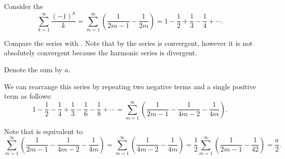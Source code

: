 \begin{example}\label{ex:riemanns_series_permutation_theorem/alternating_harmonic_series}\cite[]{Фихтенгольц1968Том2}
  Consider the 
  \begin{equation}\label{ex:riemanns_series_permutation_theorem/alternating_harmonic_series/series}
    \sum_{k=1}^\infty \frac {(-1)^k} k
    =
    \sum_{m=1}^\infty \left( \frac 1 {2m - 1} - \frac 1 {2m} \right)
    =
    1 - \frac 1 2 + \frac 1 3 - \frac 1 4 + \cdots.
  \end{equation}

  Compare the series with . Note that by  the series is convergent, however it is not absolutely convergent because the harmonic series  is divergent.

  Denote the sum by \( a \).

  We can rearrange this series by repeating two negative terms and a single positive term as follows:
  \begin{equation}\label{ex:riemanns_series_permutation_theorem/alternating_harmonic_series/rearranged}
    1 - \frac 1 2 - \frac 1 4 + \frac 1 3 - \frac 1 6 - \frac 1 8 + \cdots
    =
    \sum_{m=1}^\infty \left( \frac 1 {2m - 1} - \frac 1 {4m - 2} - \frac 1 {4m} \right).
  \end{equation}

  Note that  is equivalent to
  \begin{equation*}
    \sum_{m=1}^\infty \left( \frac 1 {2m - 1} - \frac 1 {4m - 2} - \frac 1 {4m} \right)
    =
    \sum_{m=1}^\infty \left( \frac 1 {4m - 2} - \frac 1 {4m} \right)
    =
    \frac 1 2 \sum_{m=1}^\infty \left( \frac 1 {2m - 1} - \frac 1 {42} \right)
    =
    \frac a 2.
  \end{equation*}
\end{example}

